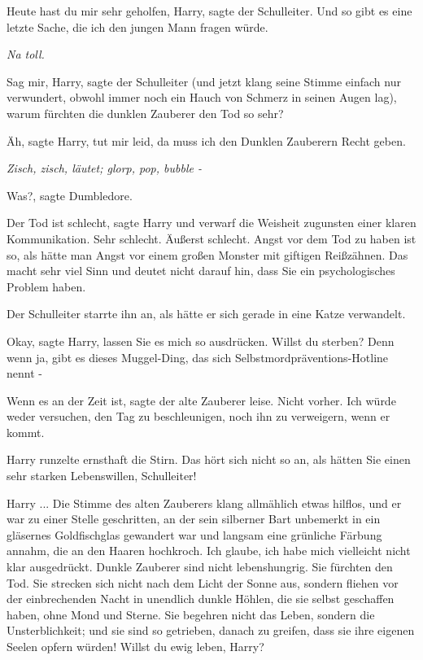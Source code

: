 \glqq{}Heute hast du mir sehr geholfen, Harry\grqq{}, sagte der Schulleiter.
\glqq{}Und so gibt es eine letzte Sache, die ich den jungen Mann fragen
würde.\grqq{}

\emph{Na toll.}

\glqq{}Sag mir, Harry\grqq{}, sagte der Schulleiter (und jetzt klang seine Stimme
einfach nur verwundert, obwohl immer noch ein Hauch von Schmerz in seinen Augen
lag), \glqq{}warum fürchten die dunklen Zauberer den Tod so sehr?\grqq{}

\glqq{}Äh\grqq{}, sagte Harry, \glqq{}tut mir leid, da muss ich den Dunklen
Zauberern Recht geben.\grqq{}

\emph{Zisch, zisch, läutet; glorp, pop, bubble -}

\glqq{}Was?\grqq{}, sagte Dumbledore.

\glqq{}Der Tod ist schlecht\grqq{}, sagte Harry und verwarf die Weisheit
zugunsten einer klaren Kommunikation. \glqq{}Sehr schlecht. Äußerst schlecht.
Angst vor dem Tod zu haben ist so, als hätte man Angst vor einem großen Monster
mit giftigen Reißzähnen. Das macht sehr viel Sinn und deutet nicht darauf hin,
dass Sie ein psychologisches Problem haben.\grqq{}

Der Schulleiter starrte ihn an, als hätte er sich gerade in eine Katze
verwandelt.

\glqq{}Okay\grqq{}, sagte Harry, \glqq{}lassen Sie es mich so ausdrücken. Willst
du sterben? Denn wenn ja, gibt es dieses Muggel-Ding, das sich
Selbstmordpräventions-Hotline nennt -\grqq{}

\glqq{}Wenn es an der Zeit ist\grqq{}, sagte der alte Zauberer leise. \glqq{}Nicht
vorher. Ich würde weder versuchen, den Tag zu beschleunigen, noch ihn zu
verweigern, wenn er kommt.\grqq{}

Harry runzelte ernsthaft die Stirn. \glqq{}Das hört sich nicht so an, als hätten
Sie einen sehr starken Lebenswillen, Schulleiter!\grqq{}

\glqq{}Harry ...\grqq{} Die Stimme des alten Zauberers klang allmählich etwas
hilflos, und er war zu einer Stelle geschritten, an der sein silberner Bart
unbemerkt in ein gläsernes Goldfischglas gewandert war und langsam eine
grünliche Färbung annahm, die an den Haaren hochkroch. \glqq{}Ich glaube, ich
habe mich vielleicht nicht klar ausgedrückt. Dunkle Zauberer sind nicht
lebenshungrig. Sie fürchten den Tod. Sie strecken sich nicht nach dem Licht der
Sonne aus, sondern fliehen vor der einbrechenden Nacht in unendlich dunkle
Höhlen, die sie selbst geschaffen haben, ohne Mond und Sterne. Sie begehren
nicht das Leben, sondern die Unsterblichkeit; und sie sind so getrieben, danach
zu greifen, dass sie ihre eigenen Seelen opfern würden! Willst du ewig leben,
Harry?\grqq{}

